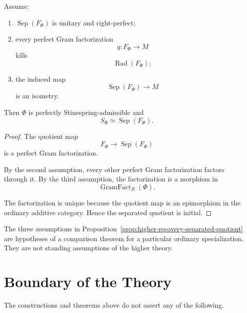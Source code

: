 \begin{proposition}
\label{prop:higher-recovery-separated-quotient}
Assume:

\begin{enumerate}
  \item \(\operatorname{Sep}(F_\Phi)\) is unitary and right-perfect;

  \item every perfect Gram factorization
  \[
    q:F_\Phi\to M
  \]
  kills
  \[
    \operatorname{Rad}(F_\Phi);
  \]

  \item the induced map
  \[
    \operatorname{Sep}(F_\Phi)\to M
  \]
  is an isometry.
\end{enumerate}

Then \(\Phi\) is perfectly Stinespring-admissible and
\[
  S_\Phi
  \simeq
  \operatorname{Sep}(F_\Phi).
\]
\end{proposition}

\begin{proof}
The quotient map
\[
  F_\Phi\to\operatorname{Sep}(F_\Phi)
\]
is a perfect Gram factorization.

By the second assumption, every other perfect Gram factorization factors
through it. By the third assumption, the factorization is a morphism in
\[
  \operatorname{GramFact}_R(\Phi).
\]

The factorization is unique because the quotient map is an epimorphism in the
ordinary additive category. Hence the separated quotient is initial.
\end{proof}

\begin{remark}
\label{rem:higher-recovery-assumptions-not-ambient}
The three assumptions in
Proposition~\ref{prop:higher-recovery-separated-quotient} are hypotheses of a
comparison theorem for a particular ordinary specialization. They are not
standing assumptions of the higher theory.
\end{remark}

\section{Boundary of the Theory}
\label{sec:higher-stinespring-boundary}

The constructions and theorems above do not assert any of the following.

